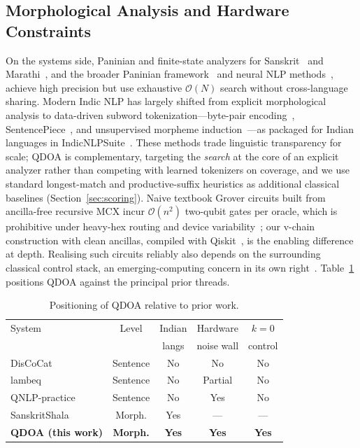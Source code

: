 \documentclass[journal]{IEEEtran}
\newcommand{\bigO}{\mathcal{O}}
\begin{document}
\subsection{Morphological Analysis and Hardware Constraints}
On the systems side, Paninian and finite-state analyzers for
Sanskrit~\cite{jha2009,kulkarni2009,huet2005} and
Marathi~\cite{bapat2010}, and the broader Paninian
framework~\cite{bharati1995} and neural NLP methods~\cite{goldberg2017}, achieve
high precision but use exhaustive $\bigO(N)$ search without cross-language
sharing. Modern Indic NLP has largely shifted from explicit morphological
analysis to data-driven subword tokenization---byte-pair
encoding~\cite{sennrich2016}, SentencePiece~\cite{kudo2018}, and unsupervised
morpheme induction~\cite{creutz2007}---as packaged for Indian languages in
IndicNLPSuite~\cite{kakwani2020}. These methods trade linguistic transparency for
scale; QDOA is complementary, targeting the \emph{search} at the core of an
explicit analyzer rather than competing with learned tokenizers on coverage, and
we use standard longest-match and productive-suffix heuristics as additional
classical baselines (Section~\ref{sec:scoring}). Naive textbook Grover circuits
built from ancilla-free recursive MCX incur $\bigO(n^{2})$ two-qubit gates per
oracle, which is prohibitive under heavy-hex routing and device
variability~\cite{kim2023,tannu2019}; our v-chain construction with clean
ancillas, compiled with Qiskit~\cite{qiskit2024}, is the enabling difference at
depth. Realising such circuits reliably also depends on the surrounding classical
control stack, an emerging-computing concern in its own right~\cite{dudley2025}.
Table~\ref{tab:positioning} positions QDOA against the principal prior threads.

\begin{table}[t]
\centering
\caption{Positioning of QDOA relative to prior work.}
\label{tab:positioning}
\small
\begin{tabular}{@{}lcccc@{}}
\toprule
System & Level & Indian & Hardware & $k{=}0$ \\
       &       & langs  & noise wall & control \\
\midrule
DisCoCat~\cite{coecke2020qa}      & Sentence & No  & No  & No \\
lambeq~\cite{lambeq2021}          & Sentence & No  & Partial & No \\
QNLP-practice~\cite{lorenz2023} & Sentence & No & Yes & No \\
SanskritShala~\cite{jha2009} & Morph. & Yes & --- & --- \\
\textbf{QDOA (this work)}     & \textbf{Morph.} & \textbf{Yes} & \textbf{Yes} & \textbf{Yes} \\
\bottomrule
\end{tabular}
\end{table}
\end{document}
